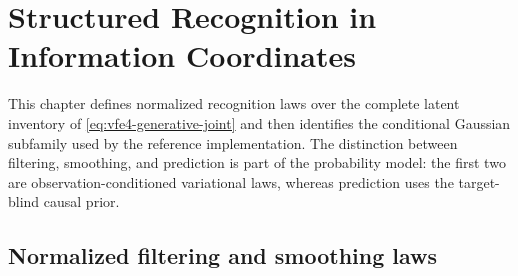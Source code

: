 \chapter{Structured Recognition in Information Coordinates}

This chapter defines normalized recognition laws over the complete latent inventory of \cref{eq:vfe4-generative-joint} and then identifies the conditional Gaussian subfamily used by the reference implementation.  The distinction between filtering, smoothing, and prediction is part of the probability model: the first two are observation-conditioned variational laws, whereas prediction uses the target-blind causal prior.

\section{Normalized filtering and smoothing laws}

